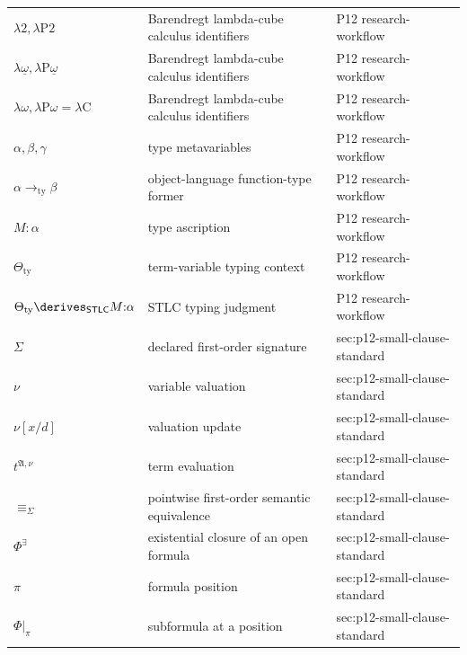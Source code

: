 \begin{longtable}{@{}p{}p{}p{}@{}}
\(\lambda 2,\allowbreak \lambda\mathrm P2\) & Barendregt lambda-cube calculus identifiers & P12 research-\allowbreak{}workflow \\
\(\lambda\underline{\omega},\allowbreak \lambda\mathrm P\underline{\omega}\) & Barendregt lambda-cube calculus identifiers & P12 research-\allowbreak{}workflow \\
\(\lambda\omega,\allowbreak \lambda\mathrm P\omega=\lambda\mathrm C\) & Barendregt lambda-cube calculus identifiers & P12 research-\allowbreak{}workflow \\
\(\alpha,\allowbreak \beta,\allowbreak \gamma\) & type metavariables & P12 research-\allowbreak{}workflow \\
\(\alpha\to_{\mathrm{ty}}\beta\) & object-language function-type former & P12 research-\allowbreak{}workflow \\
\(M{:}\alpha\) & type ascription & P12 research-\allowbreak{}workflow \\
\(\Theta_{\mathrm{ty}}\) & term-variable typing context & P12 research-\allowbreak{}workflow \\
\(\Theta_{\mathrm{ty}}\derives_{\mathsf{STLC}}M{:}\alpha\) & STLC typing judgment & P12 research-\allowbreak{}workflow \\
\(\Sigma\) & declared first-order signature & sec:\allowbreak{}p12-\allowbreak{}small-\allowbreak{}clause-\allowbreak{}standard \\
\(\nu\) & variable valuation & sec:\allowbreak{}p12-\allowbreak{}small-\allowbreak{}clause-\allowbreak{}standard \\
\(\nu[x/d]\) & valuation update & sec:\allowbreak{}p12-\allowbreak{}small-\allowbreak{}clause-\allowbreak{}standard \\
\(t^{\mathfrak A,\nu}\) & term evaluation & sec:\allowbreak{}p12-\allowbreak{}small-\allowbreak{}clause-\allowbreak{}standard \\
\(\equiv_\Sigma\) & pointwise first-order semantic equivalence & sec:\allowbreak{}p12-\allowbreak{}small-\allowbreak{}clause-\allowbreak{}standard \\
\(\Phi^\exists\) & existential closure of an open formula & sec:\allowbreak{}p12-\allowbreak{}small-\allowbreak{}clause-\allowbreak{}standard \\
\(\pi\) & formula position & sec:\allowbreak{}p12-\allowbreak{}small-\allowbreak{}clause-\allowbreak{}standard \\
\(\Phi|_\pi\) & subformula at a position & sec:\allowbreak{}p12-\allowbreak{}small-\allowbreak{}clause-\allowbreak{}standard \\

\end{longtable}
